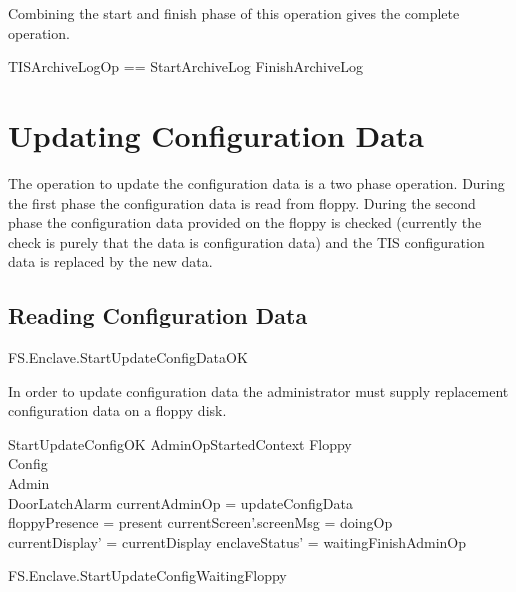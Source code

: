 Combining the start and finish phase of this operation gives the
complete operation.
\begin{zed}
        TISArchiveLogOp == StartArchiveLog \lor FinishArchiveLog
\end{zed}


\section{Updating Configuration Data}

The operation to update the configuration data is a two phase
operation. During the first phase the configuration data is read from
floppy. During the second phase the configuration data provided on the
floppy is checked (currently the check is purely that the data is
configuration data) and the TIS configuration data is replaced by the
new data.


\subsection{Reading Configuration Data}

\begin{traceunit}{FS.Enclave.StartUpdateConfigDataOK}
\end{traceunit}

In order to update configuration data the administrator must supply
replacement configuration data on a floppy disk.


\begin{schema}{StartUpdateConfigOK}
        AdminOpStartedContext
\also   
        \Xi Floppy
\\      \Xi Config
\\      \Xi Admin     
\\      \Xi DoorLatchAlarm
\where
       \The currentAdminOp = updateConfigData
\\      floppyPresence = present
\also
        currentScreen'.screenMsg = doingOp
\\      currentDisplay' = currentDisplay
\also
        enclaveStatus' = waitingFinishAdminOp
\end{schema}

\begin{traceunit}{FS.Enclave.StartUpdateConfigWaitingFloppy}
\end{traceunit}


